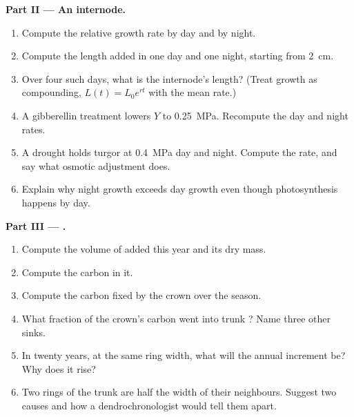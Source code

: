 \begin{problem}
\medskip
\noindent\textbf{Part II --- An internode.}
\begin{enumerate}[resume]
  \item Compute the relative growth rate by day and by night.
  \item Compute the length added in one day and one night, starting
        from \qty{2}{cm}.
  \item Over four such days, what is the internode's length?
        (Treat growth as compounding, $L(t) = L_0 e^{rt}$ with the
        mean rate.)
  \item A gibberellin treatment lowers $Y$ to \qty{0.25}{MPa}.
        Recompute the day and night rates.
  \item A drought holds turgor at \qty{0.4}{MPa} day and night.
        Compute the rate, and say what osmotic adjustment does.
  \item Explain why night growth exceeds day growth even though
        photosynthesis happens by day.
\end{enumerate}

\medskip
\noindent\textbf{Part III --- .}
\begin{enumerate}[resume]
  \item Compute the volume of  added this year and its dry mass.
  \item Compute the carbon in it.
  \item Compute the carbon fixed by the crown over the season.
  \item What fraction of the crown's carbon went into trunk ?
        Name three other sinks.
  \item In twenty years, at the same ring width, what will the annual
         increment be? Why does it rise?
  \item Two rings of the trunk are half the width of their
        neighbours. Suggest two causes and how a dendrochronologist
        would tell them apart.
\end{enumerate}


\end{problem}
